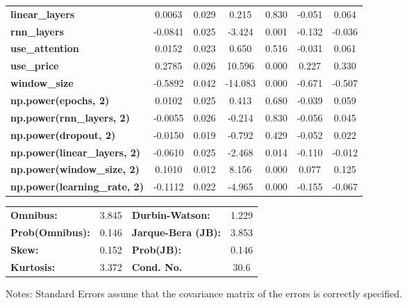 \begin{center}
\begin{tabular}{lcccccc}
\textbf{linear\_layers}              &       0.0063  &        0.029     &     0.215  &         0.830        &       -0.051    &        0.064     \\
\textbf{rnn\_layers}                 &      -0.0841  &        0.025     &    -3.424  &         0.001        &       -0.132    &       -0.036     \\
\textbf{use\_attention}              &       0.0152  &        0.023     &     0.650  &         0.516        &       -0.031    &        0.061     \\
\textbf{use\_price}                  &       0.2785  &        0.026     &    10.596  &         0.000        &        0.227    &        0.330     \\
\textbf{window\_size}                &      -0.5892  &        0.042     &   -14.083  &         0.000        &       -0.671    &       -0.507     \\
\textbf{np.power(epochs, 2)}         &       0.0102  &        0.025     &     0.413  &         0.680        &       -0.039    &        0.059     \\
\textbf{np.power(rnn\_layers, 2)}    &      -0.0055  &        0.026     &    -0.214  &         0.830        &       -0.056    &        0.045     \\
\textbf{np.power(dropout, 2)}        &      -0.0150  &        0.019     &    -0.792  &         0.429        &       -0.052    &        0.022     \\
\textbf{np.power(linear\_layers, 2)} &      -0.0610  &        0.025     &    -2.468  &         0.014        &       -0.110    &       -0.012     \\
\textbf{np.power(window\_size, 2)}   &       0.1010  &        0.012     &     8.156  &         0.000        &        0.077    &        0.125     \\
\textbf{np.power(learning\_rate, 2)} &      -0.1112  &        0.022     &    -4.965  &         0.000        &       -0.155    &       -0.067     \\
\bottomrule
\end{tabular}
\begin{tabular}{lclc}
\textbf{Omnibus:}       &  3.845 & \textbf{  Durbin-Watson:     } &    1.229  \\
\textbf{Prob(Omnibus):} &  0.146 & \textbf{  Jarque-Bera (JB):  } &    3.853  \\
\textbf{Skew:}          &  0.152 & \textbf{  Prob(JB):          } &    0.146  \\
\textbf{Kurtosis:}      &  3.372 & \textbf{  Cond. No.          } &     30.6  \\
\bottomrule
\end{tabular}
\end{center}

Notes: \newline
 [1] Standard Errors assume that the covariance matrix of the errors is correctly specified.